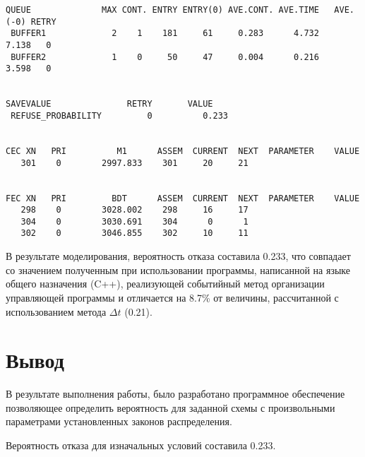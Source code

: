 \begin{lstlisting}[caption={Отчет о работе системы}]
QUEUE              MAX CONT. ENTRY ENTRY(0) AVE.CONT. AVE.TIME   AVE.(-0) RETRY
 BUFFER1             2    1    181     61     0.283      4.732      7.138   0
 BUFFER2             1    0     50     47     0.004      0.216      3.598   0


SAVEVALUE               RETRY       VALUE
 REFUSE_PROBABILITY         0          0.233                            


CEC XN   PRI          M1      ASSEM  CURRENT  NEXT  PARAMETER    VALUE
   301    0        2997.833    301     20     21


FEC XN   PRI         BDT      ASSEM  CURRENT  NEXT  PARAMETER    VALUE
   298    0        3028.002    298     16     17
   304    0        3030.691    304      0      1
   302    0        3046.855    302     10     11
\end{lstlisting}

В результате моделирования, вероятность отказа составила 0.233, что совпадает
со значением полученным при использовании программы, написанной на языке
общего назначения (C++), реализующей событийный метод организации управляющей
программы и отличается на 8.7\% от величины, рассчитанной с использованием
метода $\Delta t$ (0.21).

\clearpage

\section*{Вывод}

В результате выполнения работы, было разработано программное обеспечение
позволяющее определить вероятность для заданной схемы с произвольными
параметрами установленных законов распределения.

Вероятность отказа для изначальных условий составила 0.233.

